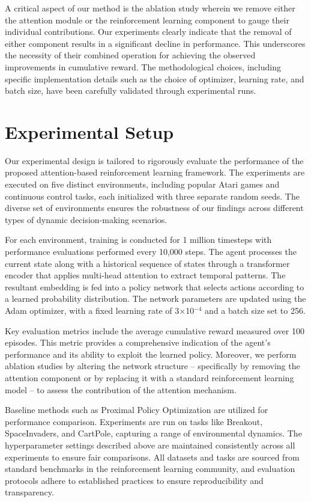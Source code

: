 \documentclass{article} %
\begin{document}
A critical aspect of our method is the ablation study wherein we remove either the attention module or the reinforcement learning component to gauge their individual contributions. Our experiments clearly indicate that the removal of either component results in a significant decline in performance. This underscores the necessity of their combined operation for achieving the observed improvements in cumulative reward. The methodological choices, including specific implementation details such as the choice of optimizer, learning rate, and batch size, have been carefully validated through experimental runs.

\section{Experimental Setup}
\label{sec:experimental}
Our experimental design is tailored to rigorously evaluate the performance of the proposed attention-based reinforcement learning framework. The experiments are executed on five distinct environments, including popular Atari games and continuous control tasks, each initialized with three separate random seeds. The diverse set of environments ensures the robustness of our findings across different types of dynamic decision-making scenarios.

For each environment, training is conducted for 1 million timesteps with performance evaluations performed every 10,000 steps. The agent processes the current state along with a historical sequence of states through a transformer encoder that applies multi-head attention to extract temporal patterns. The resultant embedding is fed into a policy network that selects actions according to a learned probability distribution. The network parameters are updated using the Adam optimizer, with a fixed learning rate of 3\(\times\)10\(^{-4}\) and a batch size set to 256.

Key evaluation metrics include the average cumulative reward measured over 100 episodes. This metric provides a comprehensive indication of the agent’s performance and its ability to exploit the learned policy. Moreover, we perform ablation studies by altering the network structure – specifically by removing the attention component or by replacing it with a standard reinforcement learning model – to assess the contribution of the attention mechanism.

Baseline methods such as Proximal Policy Optimization \cite{schulman_2017_ppo} are utilized for performance comparison. Experiments are run on tasks like Breakout, SpaceInvaders, and CartPole, capturing a range of environmental dynamics. The hyperparameter settings described above are maintained consistently across all experiments to ensure fair comparisons. All datasets and tasks are sourced from standard benchmarks in the reinforcement learning community, and evaluation protocols adhere to established practices to ensure reproducibility and transparency.
\end{document}
